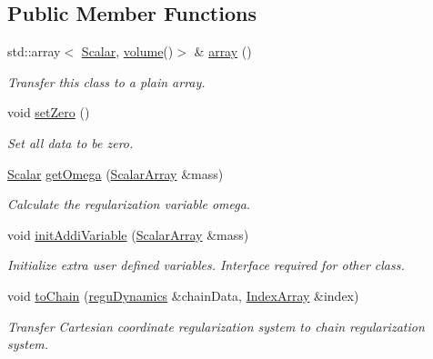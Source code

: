\subsection*{Public Member Functions}
\begin{DoxyCompactItemize}
\item 
std\+::array$<$ \mbox{\hyperlink{classregu_dynamics_a359c55370b4dee032396f0df86ad5fab}{Scalar}}, \mbox{\hyperlink{classregu_dynamics_a3a00b2009ce88898871ca024c30c6882}{volume}}()$>$ \& \mbox{\hyperlink{classregu_dynamics_aa1c12cfc524f02a52590b2659db79795}{array}} ()
\begin{DoxyCompactList}\small\item\em Transfer this class to a plain array. \end{DoxyCompactList}\item 
void \mbox{\hyperlink{classregu_dynamics_a50e6ec7efc990c325d3694e225f04194}{set\+Zero}} ()
\begin{DoxyCompactList}\small\item\em Set all data to be zero. \end{DoxyCompactList}\item 
\mbox{\hyperlink{classregu_dynamics_a359c55370b4dee032396f0df86ad5fab}{Scalar}} \mbox{\hyperlink{classregu_dynamics_a0fe3b4f9a468687ec1f004120b347ddd}{get\+Omega}} (\mbox{\hyperlink{classregu_dynamics_a34b4b77ea3e49e1cdef584ec8bd281dc}{Scalar\+Array}} \&mass)
\begin{DoxyCompactList}\small\item\em Calculate the regularization variable omega. \end{DoxyCompactList}\item 
void \mbox{\hyperlink{classregu_dynamics_aa42158ddf3c5385aa89988b9bb80ff29}{init\+Addi\+Variable}} (\mbox{\hyperlink{classregu_dynamics_a34b4b77ea3e49e1cdef584ec8bd281dc}{Scalar\+Array}} \&mass)
\begin{DoxyCompactList}\small\item\em Initialize extra user defined variables. Interface required for other class. \end{DoxyCompactList}\item 
void \mbox{\hyperlink{classregu_dynamics_aae4e77bbbb00f0bdddb396047f1c0fc2}{to\+Chain}} (\mbox{\hyperlink{classregu_dynamics}{regu\+Dynamics}} \&chain\+Data, \mbox{\hyperlink{classregu_dynamics_a2c9fa7372e4a11be9d85728b4a0e455f}{Index\+Array}} \&index)
\begin{DoxyCompactList}\small\item\em Transfer Cartesian coordinate regularization system to chain regularization system. \end{DoxyCompactList}\item 

\end{DoxyCompactItemize}
